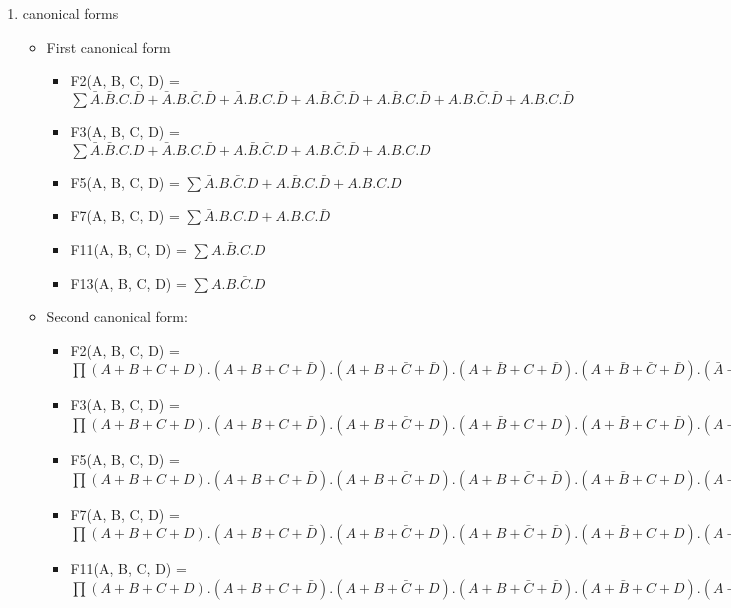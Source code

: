 \begin{enumerate}
        
\item canonical forms 
\begin{itemize}
\item First canonical form 
\begin{itemize}
\item F2(A, B, C, D) = $\sum \bar A.\bar B.C.\bar D + \bar A.B.\bar C.\bar D + \bar A.B.C.\bar D + A.\bar B.\bar C.\bar D + A.\bar B.C.\bar D + A.B.\bar C.\bar D + A.B.C.\bar D$
\item F3(A, B, C, D) = $\sum \bar A.\bar B.C.D + \bar A.B.C.\bar D + A.\bar B.\bar C.D + A.B.\bar C.\bar D + A.B.C.D$
\item F5(A, B, C, D) = $\sum \bar A.B.\bar C.D + A.\bar B.C.\bar D + A.B.C.D$
\item F7(A, B, C, D) = $\sum \bar A.B.C.D + A.B.C.\bar D$
\item F11(A, B, C, D) = $\sum A.\bar B.C.D$
\item F13(A, B, C, D) = $\sum A.B.\bar C.D$
\end{itemize}
\item Second canonical form: 
\begin{itemize}
\item F2(A, B, C, D) = $\prod (A+B+C+D) . (A+B+C+\bar D) . (A+B+\bar C+\bar D) . (A+\bar B+C+\bar D) . (A+\bar B+\bar C+\bar D) . (\bar A+B+C+\bar D) . (\bar A+B+\bar C+\bar D) . (\bar A+\bar B+C+\bar D) . (\bar A+\bar B+\bar C+\bar D)$
\item F3(A, B, C, D) = $\prod (A+B+C+D) . (A+B+C+\bar D) . (A+B+\bar C+D) . (A+\bar B+C+D) . (A+\bar B+C+\bar D) . (A+\bar B+\bar C+\bar D) . (\bar A+B+C+D) . (\bar A+B+\bar C+D) . (\bar A+B+\bar C+\bar D) . (\bar A+\bar B+C+\bar D) . (\bar A+\bar B+\bar C+D)$
\item F5(A, B, C, D) = $\prod (A+B+C+D) . (A+B+C+\bar D) . (A+B+\bar C+D) . (A+B+\bar C+\bar D) . (A+\bar B+C+D) . (A+\bar B+\bar C+D) . (A+\bar B+\bar C+\bar D) . (\bar A+B+C+D) . (\bar A+B+C+\bar D) . (\bar A+B+\bar C+\bar D) . (\bar A+\bar B+C+D) . (\bar A+\bar B+C+\bar D) . (\bar A+\bar B+\bar C+D)$
\item F7(A, B, C, D) = $\prod (A+B+C+D) . (A+B+C+\bar D) . (A+B+\bar C+D) . (A+B+\bar C+\bar D) . (A+\bar B+C+D) . (A+\bar B+C+\bar D) . (A+\bar B+\bar C+D) . (\bar A+B+C+D) . (\bar A+B+C+\bar D) . (\bar A+B+\bar C+D) . (\bar A+B+\bar C+\bar D) . (\bar A+\bar B+C+D) . (\bar A+\bar B+C+\bar D) . (\bar A+\bar B+\bar C+\bar D)$
\item F11(A, B, C, D) = $\prod (A+B+C+D) . (A+B+C+\bar D) . (A+B+\bar C+D) . (A+B+\bar C+\bar D) . (A+\bar B+C+D) . (A+\bar B+C+\bar D) . (A+\bar B+\bar C+D) . (A+\bar B+\bar C+\bar D) . (\bar A+B+C+D) . (\bar A+B+C+\bar D) . (\bar A+B+\bar C+D) . (\bar A+\bar B+C+D) . (\bar A+\bar B+C+\bar D) . (\bar A+\bar B+\bar C+D) . (\bar A+\bar B+\bar C+\bar D)$

\end{itemize}
\end{itemize}
\end{enumerate}
